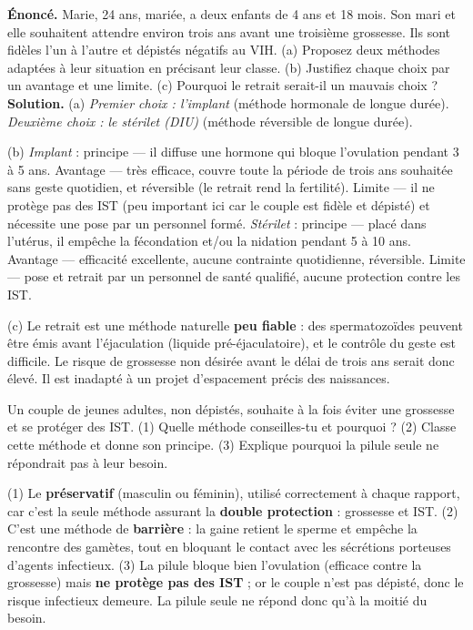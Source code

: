 \documentclass[11pt]{article}
\begin{document}
\begin{exoresolu}
\textbf{Énoncé.} Marie, 24 ans, mariée, a deux enfants de 4 ans et 18 mois. Son mari et elle souhaitent attendre environ trois ans avant une troisième grossesse. Ils sont fidèles l'un à l'autre et dépistés négatifs au VIH. (a) Proposez deux méthodes adaptées à leur situation en précisant leur classe. (b) Justifiez chaque choix par un avantage et une limite. (c) Pourquoi le retrait serait-il un mauvais choix ?
\tcblower
\textbf{Solution.}
(a) \emph{Premier choix : l'implant} (méthode hormonale de longue durée). \emph{Deuxième choix : le stérilet (DIU)} (méthode réversible de longue durée).

(b) \emph{Implant} : principe — il diffuse une hormone qui bloque l'ovulation pendant 3 à 5 ans. Avantage — très efficace, couvre toute la période de trois ans souhaitée sans geste quotidien, et réversible (le retrait rend la fertilité). Limite — il ne protège pas des IST (peu important ici car le couple est fidèle et dépisté) et nécessite une pose par un personnel formé. \emph{Stérilet} : principe — placé dans l'utérus, il empêche la fécondation et/ou la nidation pendant 5 à 10 ans. Avantage — efficacité excellente, aucune contrainte quotidienne, réversible. Limite — pose et retrait par un personnel de santé qualifié, aucune protection contre les IST.

(c) Le retrait est une méthode naturelle \textbf{peu fiable} : des spermatozoïdes peuvent être émis avant l'éjaculation (liquide pré-éjaculatoire), et le contrôle du geste est difficile. Le risque de grossesse non désirée avant le délai de trois ans serait donc élevé. Il est inadapté à un projet d'espacement précis des naissances.
\end{exoresolu}

\begin{exercice}
Un couple de jeunes adultes, non dépistés, souhaite à la fois éviter une grossesse et se protéger des IST. (1) Quelle méthode conseilles-tu et pourquoi ? (2) Classe cette méthode et donne son principe. (3) Explique pourquoi la pilule seule ne répondrait pas à leur besoin.
\end{exercice}

\begin{corrige}
(1) Le \textbf{préservatif} (masculin ou féminin), utilisé correctement à chaque rapport, car c'est la seule méthode assurant la \textbf{double protection} : grossesse et IST. (2) C'est une méthode de \textbf{barrière} : la gaine retient le sperme et empêche la rencontre des gamètes, tout en bloquant le contact avec les sécrétions porteuses d'agents infectieux. (3) La pilule bloque bien l'ovulation (efficace contre la grossesse) mais \textbf{ne protège pas des IST} ; or le couple n'est pas dépisté, donc le risque infectieux demeure. La pilule seule ne répond donc qu'à la moitié du besoin.
\end{corrige}
\end{document}

